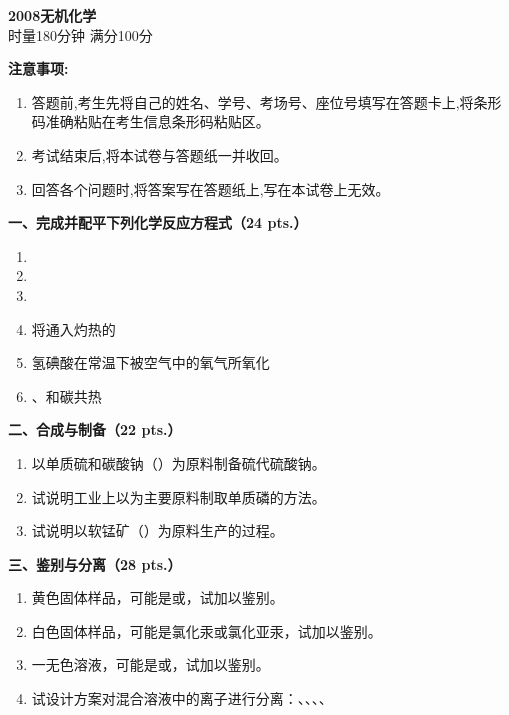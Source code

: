 \begin{center}
    {\LARGE \textbf{2008无机化学}} \\[2ex]
    {\large 时量180分钟 \quad 满分100分}
\end{center}

\vspace{0.5cm}
\noindent\textbf{注意事项:}
\begin{enumerate}[label=\arabic*., parsep=0pt, itemsep=0pt]
    \item 答题前,考生先将自己的姓名、学号、考场号、座位号填写在答题卡上,将条形码准确粘贴在考生信息条形码粘贴区。
    \item 考试结束后,将本试卷与答题纸一并收回。
    \item 回答各个问题时,将答案写在答题纸上,写在本试卷上无效。
\end{enumerate}

\vspace{0.5cm}
\noindent\textbf{一、完成并配平下列化学反应方程式（24 pts.）}

\begin{enumerate}[label=\arabic*., start=1, itemsep=1.5ex]
    \item {}
    \item {}
    \item {}
    \item 将通入灼热的
    \item 氢碘酸在常温下被空气中的氧气所氧化
    \item {}、和碳共热
\end{enumerate}

\vspace{0.5cm}
\noindent\textbf{二、合成与制备（22 pts.）}

\begin{enumerate}[label=\arabic*., start=1, itemsep=1.5ex]
    \item 以单质硫和碳酸钠（）为原料制备硫代硫酸钠。
    \item 试说明工业上以为主要原料制取单质磷的方法。
    \item 试说明以软锰矿（）为原料生产的过程。
\end{enumerate}

\vspace{0.5cm}
\noindent\textbf{三、鉴别与分离（28 pts.）}

\begin{enumerate}[label=\arabic*., start=1, itemsep=1.5ex]
    \item 黄色固体样品，可能是或，试加以鉴别。
    \item 白色固体样品，可能是氯化汞或氯化亚汞，试加以鉴别。
    \item 一无色溶液，可能是或，试加以鉴别。
    \item 试设计方案对混合溶液中的离子进行分离：、、、、
\end{enumerate}

